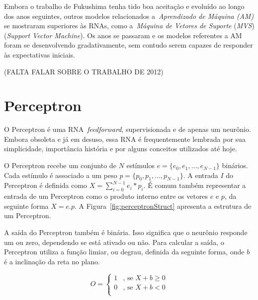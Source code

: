 Embora o trabalho de Fukushima tenha tido boa aceitação e evoluído ao longo dos anos seguintes, outros modelos relacionados a~\emph{Aprendizado de Máquina (AM)}  se mostraram superiores às RNAs, como a~\emph{Máquina de Vetores de Suporte} (\emph{MVS}) (\emph{Support Vector Machine}). Os anos se passaram e os modelos referentes a AM foram se desenvolvendo gradativamente, sem contudo serem capazes de responder às expectativas iniciais. 

(FALTA FALAR SOBRE O TRABALHO DE 2012)

\section{Perceptron}
\label{sec:RedesNeurais:Perceptron}

O Perceptron é uma RNA~\emph{feedforward}, supervisionada e de apenas um neurônio. Embora obsoleta e já em desuso, essa RNA é frequentemente lembrada por sua simplicidade, importância história e por alguns conceitos utilizados até hoje.

O Perceptron recebe um conjunto de $N$ estímulos $e = \{e_0, e_1, \hdots, e_{N-1}\}$ binários. Cada estímulo é associado a um peso $p = \{p_0, p_1, \hdots, p_{N-1}\}$. A entrada $I$ do Perceptron é definida como $X = \sum_{i=0}^{N-1} e_i*p_i$. É comum também representar a entrada de um Perceptron como o produto interno entre os vetores $e$ e $p$, da seguinte forma $X = e.p$. A Figura~\ref{fig:perceptronStruct} apresenta a estrutura de um Perceptron.

A saída do Perceptron também é binária. Isso significa que o neurônio responde um ou zero, dependendo se está ativado ou não. Para calcular a saída, o Perceptron utiliza a função limiar, ou degrau, definida da seguinte forma, onde $b$ é a inclinação da reta no plano.

\begin{equation}
O = \begin{cases}       
	  1 &\text{, se } X + b \geq 0 \\
      0 &\text{, se } X + b < 0 \\
   \end{cases}
\end{equation}

